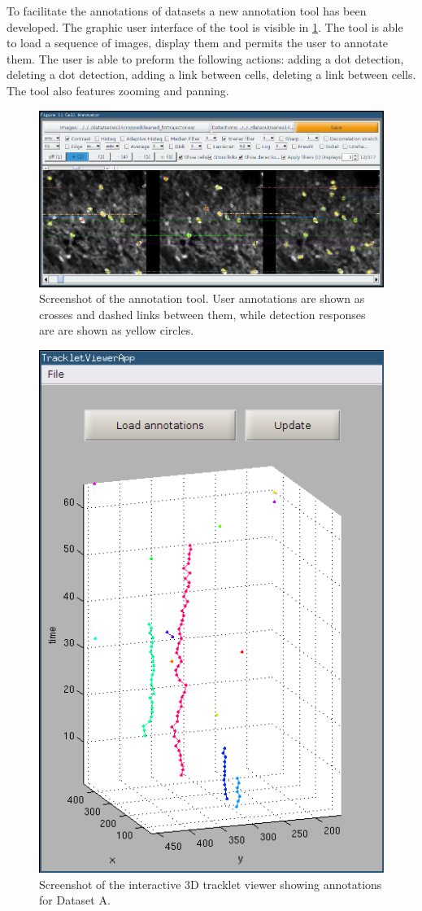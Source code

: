 		To facilitate the annotations of datasets a new annotation tool has been developed. The graphic user interface of the tool is visible in \cref{fig:data_annotator_screenshot}. The tool is able to load a sequence of images, display them and permits the user to annotate them. The user is able to preform the following actions: adding a dot detection, deleting a dot detection, adding a link between cells, deleting a link between cells. The tool also features zooming and panning.
		

		\begin{figure}
			\includegraphics[width=\textwidth]{images/data_annotator_screenshot}
			\caption{Screenshot of the annotation tool. User annotations are shown as crosses and dashed links between them, while detection responses are are shown as yellow circles.}
			\label{fig:data_annotator_screenshot}
		\end{figure}
		
		\begin{figure}
			\centering
			\includegraphics[width=.48\textwidth]{images/data_tracklet_viewer}
			\caption{Screenshot of the interactive 3D tracklet viewer showing annotations for Dataset A.}
			\label{fig:data_tracklet_viewer}
			
		\end{figure}
				
